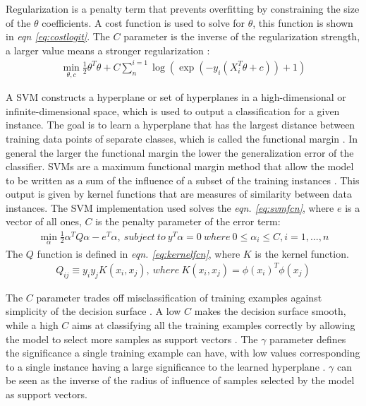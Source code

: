 \documentclass[ms]{nuthesis}
\begin{document}
Regularization is a penalty term that prevents overfitting by constraining the
size of the $\theta$ coefficients.
A cost function is used to solve for $\theta$, this
function is shown in \textit{eqn \ref{eq:costlogit}}. The $C$ parameter is the inverse of the regularization
strength, a larger value means a stronger regularization \cite{scikit-learn}:
\FloatBarrier
\begin{equation}
\label{eq:costlogit}
\begin{aligned}
\min_{\theta,c}\frac{1}{2}\theta^{T}\theta + C\sum_{n}^{i=1}\log(\exp(-y_i(X_{i}^{T}\theta+c))+1)
\end{aligned}
\end{equation}
\FloatBarrier
\par A SVM constructs a hyperplane or set of hyperplanes in a high-dimensional or infinite-dimensional space, which
is used to output a classification for a given instance. The goal is to learn a hyperplane that has
the largest distance between training data points of separate classes, which is called the functional margin
\cite{scikit-learn}. In general the larger the functional margin the lower the generalization error of the
classifier. SVMs are a maximum functional margin method that allow the model to be written as a sum of the
influence of a subset of the training instances \cite{ethem}. This output is given by kernel functions
that are measures of similarity between data instances. The SVM implementation used solves the
\textit{eqn. \ref{eq:svmfcn}}, where $e$ is a vector of all ones, $C$ is the penalty parameter of the
error term:
\FloatBarrier
\begin{equation}
\label{eq:svmfcn}
\begin{aligned}
\min_{\alpha} \frac{1}{2} \alpha^{T} Q\alpha - e^T\alpha, \
subject\  to\ y^T \alpha = 0 \ where\ 0\leq\alpha_i\leq C,i=1,...,n
\end{aligned}
\end{equation}
\FloatBarrier
The $Q$ function is defined in \textit{eqn. \ref{eq:kernelfcn}}, where $K$ is the kernel function.
\FloatBarrier
\begin{equation}
\label{eq:kernelfcn}
\begin{aligned}
Q_{ij}\equiv y_i y_j K(x_i,x_j), \ where \ K(x_i,x_j)=\phi (x_i)^T \phi(x_j)
\end{aligned}
\end{equation}
\FloatBarrier

The $C$ parameter trades off misclassification of training examples against simplicity of the
decision surface \cite{scikit-learn}. A low $C$ makes the decision surface smooth, while a high $C$ aims at
classifying all the training examples correctly by allowing the model to select more samples as support
vectors \cite{scikit-learn}. The $\gamma$ parameter defines the significance a single training example
 can have, with low values corresponding to a single instance having a large significance to the
 learned hyperplane \cite{scikit-learn}. $\gamma$ can be seen as the inverse of the radius of
 influence of samples selected by the model as support vectors.
\end{document}
